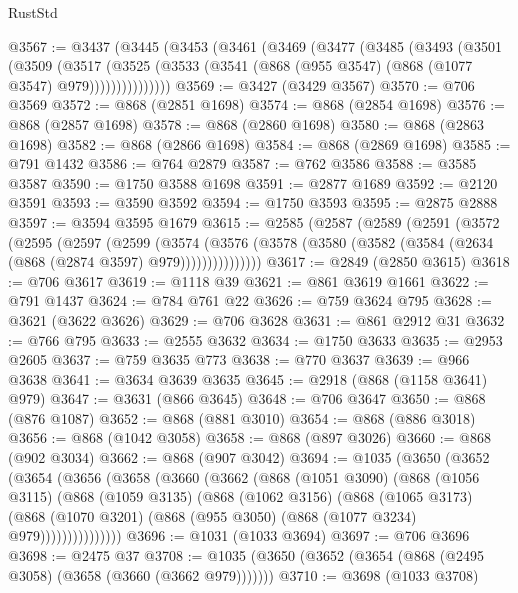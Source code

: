 \begin{lexlean}{RustStd}
\begin{coremodule}
@3567 := @3437
    (@3445
      (@3453
        (@3461
          (@3469
            (@3477
              (@3485
                (@3493
                  (@3501
                    (@3509
                      (@3517
                        (@3525
                          (@3533 (@3541 (@868 (@955 @3547) (@868 (@1077 @3547) @979)))))))))))))))
@3569 := @3427 (@3429 @3567)
@3570 := @706 @3569
@3572 := @868 (@2851 @1698)
@3574 := @868 (@2854 @1698)
@3576 := @868 (@2857 @1698)
@3578 := @868 (@2860 @1698)
@3580 := @868 (@2863 @1698)
@3582 := @868 (@2866 @1698)
@3584 := @868 (@2869 @1698)
@3585 := @791 @1432
@3586 := @764 @2879
@3587 := @762 @3586
@3588 := @3585 @3587
@3590 := @1750 @3588 @1698
@3591 := @2877 @1689
@3592 := @2120 @3591
@3593 := @3590 @3592
@3594 := @1750 @3593
@3595 := @2875 @2888
@3597 := @3594 @3595 @1679
@3615 := @2585
    (@2587
      (@2589
        (@2591
          (@3572
            (@2595
              (@2597
                (@2599
                  (@3574
                    (@3576
                      (@3578 (@3580 (@3582 (@3584 (@2634 (@868 (@2874 @3597) @979)))))))))))))))
@3617 := @2849 (@2850 @3615)
@3618 := @706 @3617
@3619 := @1118 @39
@3621 := @861 @3619 @1661
@3622 := @791 @1437
@3624 := @784 @761 @22
@3626 := @759 @3624 @795
@3628 := @3621 (@3622 @3626)
@3629 := @706 @3628
@3631 := @861 @2912 @31
@3632 := @766 @795
@3633 := @2555 @3632
@3634 := @1750 @3633
@3635 := @2953 @2605
@3637 := @759 @3635 @773
@3638 := @770 @3637
@3639 := @966 @3638
@3641 := @3634 @3639 @3635
@3645 := @2918 (@868 (@1158 @3641) @979)
@3647 := @3631 (@866 @3645)
@3648 := @706 @3647
@3650 := @868 (@876 @1087)
@3652 := @868 (@881 @3010)
@3654 := @868 (@886 @3018)
@3656 := @868 (@1042 @3058)
@3658 := @868 (@897 @3026)
@3660 := @868 (@902 @3034)
@3662 := @868 (@907 @3042)
@3694 := @1035
    (@3650
      (@3652
        (@3654
          (@3656
            (@3658
              (@3660
                (@3662
                  (@868
                    (@1051 @3090)
                    (@868
                      (@1056 @3115)
                      (@868
                        (@1059 @3135)
                        (@868
                          (@1062 @3156)
                          (@868
                            (@1065 @3173)
                            (@868
                              (@1070 @3201)
                              (@868 (@955 @3050) (@868 (@1077 @3234) @979)))))))))))))))
@3696 := @1031 (@1033 @3694)
@3697 := @706 @3696
@3698 := @2475 @37
@3708 := @1035 (@3650 (@3652 (@3654 (@868 (@2495 @3058) (@3658 (@3660 (@3662 @979)))))))
@3710 := @3698 (@1033 @3708)

\end{coremodule}
\end{lexlean}
